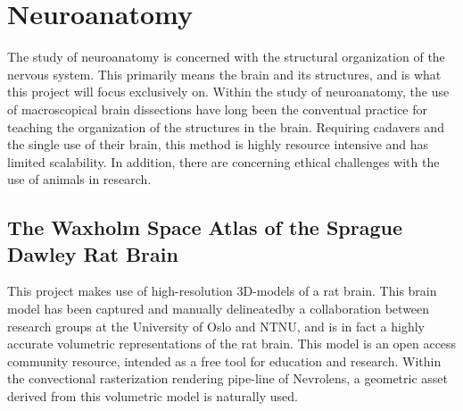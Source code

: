 
\section{Neuroanatomy}

The study of neuroanatomy is concerned with the structural organization of the nervous system. This primarily means the brain and its structures, and is what this project will focus exclusively on.
Within the study of neuroanatomy, the use of macroscopical brain dissections have long been the conventual practice for teaching the organization of the structures in the brain. Requiring cadavers and the single use of their brain, this method is highly resource intensive and has limited scalability. In addition, there are concerning ethical challenges with the use of animals in research. 


\subsection*{The Waxholm Space Atlas of the Sprague Dawley Rat Brain}\label{chap:ratbrain}




This project makes use of high-resolution 3D-models of a rat brain. This brain model has been captured and manually delineated\footnotemark[1] by a collaboration between research groups at the University of Oslo and NTNU, and is in fact a highly accurate volumetric representations of the rat brain. This model is an open access community resource, intended as a free tool for education and research\footnotemark[2]. Within the convectional rasterization rendering pipe-line of Nevrolens, a geometric asset derived from this volumetric model is naturally used. 


